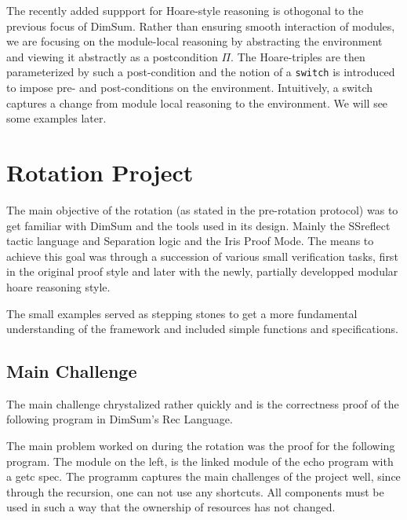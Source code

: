 \documentclass[runningheads, orivec]{llncs}
\begin{document}
The recently added suppport for Hoare-style reasoning is othogonal to the previous focus of DimSum. Rather than ensuring smooth interaction of modules, we are focusing on the module-local reasoning by abstracting the environment and viewing it abstractly as a postcondition $\Pi$. The Hoare-triples are then parameterized by such a post-condition and the notion of a \texttt{switch} is introduced to impose pre- and post-conditions on the environment. Intuitively, a switch captures a change from module local reasoning to the environment. We will see some examples later.

\section{Rotation Project}

The main objective of the rotation (as stated in the pre-rotation protocol) was to get familiar with DimSum and the tools used in its design. Mainly the SSreflect tactic language and Separation logic and the Iris Proof Mode. The means to achieve this goal was through a succession of various small verification tasks, first in the original proof style and later with the newly, partially developped modular hoare reasoning style.

The small examples served as stepping stones to get a more fundamental understanding of the framework and included simple functions and specifications.

\subsection{Main Challenge}

The main challenge chrystalized rather quickly and is the correctness proof of the following program in DimSum's Rec Language.

The main problem worked on during the rotation was the proof for the following program. The module on the left, is the linked module of the echo program with a getc spec.
The programm captures the main challenges of the project well, since through the recursion, one can not use any shortcuts. All components must be used in such a way that the ownership of resources has not changed.
\end{document}
